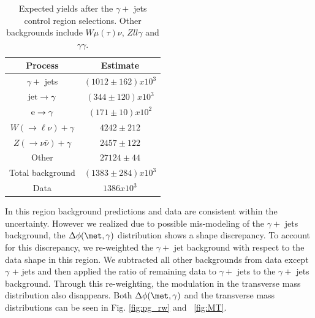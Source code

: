 \begin{table}[!h]
\center
{
\begin{tabular}{|c|c|}
\hline
Process & Estimate \\
\hline
$\gamma +$ jets                          & $(1012 \pm 162 ) x 10^3$ \\
${\rm jet}\rightarrow \gamma$        & $(344 \pm 120 ) x 10^3$ \\
${\rm e} \rightarrow \gamma$         & $(171 \pm 10 ) x 10^2$ \\
$W(\to \ell\nu)+\gamma $                 &  $4242 \pm 212$ \\
$Z( \to \nu \bar{\nu} )+\gamma    $      &  $2457 \pm 122$ \\
Other                                    &  $27124 \pm 44$ \\
\hline
Total background                       &   $(1383 \pm 284 ) x 10^3$ \\
\hline
Data                                   &  $1386 x 10^3$  \\
\hline
\end{tabular}
\caption{Expected yields after the $\gamma +$ jets control region selections. Other backgrounds include $W\mu(\tau)\nu$, $Zll\gamma$ and $\gamma\gamma$.}
\label{tab:pg_CR}}
\end{table}

In this region background predictions and data are consistent within the uncertainty. However we realized due to possible mis-modeling of the $\gamma + $ jets background, the $\Delta \phi (\met,\gamma)$ distribution shows a shape discrepancy. To account for this discrepancy, we re-weighted the  $\gamma + $ jet background with respect to the data shape in this region. We subtracted all other backgrounds from data except $\gamma$ + jets and then applied the ratio of remaining data to  $\gamma + $ jets to the  $\gamma + $ jets background. Through this re-weighting, the modulation in the transverse mass distribution also disappears. Both  $\Delta \phi (\met,\gamma)$  and the transverse mass distributions can be seen in Fig. \ref{fig:pg_rw} and ~\ref{fig:MT}.

